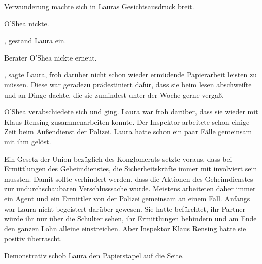 Verwunderung machte sich in Lauras Gesichtsausdruck breit. 

\par

O'Shea nickte. 

\par

, gestand Laura ein. 

\par

Berater O’Shea nickte erneut. 

\par

, sagte Laura, froh darüber nicht schon wieder ermüdende Papierarbeit leisten zu müssen. Diese war geradezu prädestiniert dafür, dass sie beim lesen abschweifte und an Dinge dachte, die sie zumindest unter der Woche gerne vergaß.

\par

O’Shea verabschiedete sich und ging. Laura war froh darüber, dass sie wieder mit Klaus Rensing zusammenarbeiten konnte. Der Inspektor arbeitete schon einige Zeit beim Außendienst der Polizei. Laura hatte schon ein paar Fälle gemeinsam mit ihm gelöst.

\par

Ein Gesetz der Union bezüglich des Konglomerats setzte voraus, dass bei Ermittlungen des Geheimdienstes, die Sicherheitskräfte immer mit involviert sein mussten. Damit sollte verhindert werden, dass die Aktionen des Geheimdienstes zur undurchschaubaren Verschlusssache wurde. Meistens arbeiteten daher immer ein Agent und ein Ermittler von der Polizei gemeinsam an einem Fall. Anfangs war Laura nicht begeistert darüber gewesen. Sie hatte befürchtet, ihr Partner würde ihr nur über die Schulter sehen, ihr Ermittlungen behindern und am Ende den ganzen Lohn alleine einstreichen. Aber Inspektor Klaus Rensing hatte sie positiv überrascht.

\par

Demonstrativ schob Laura den Papierstapel auf die Seite.